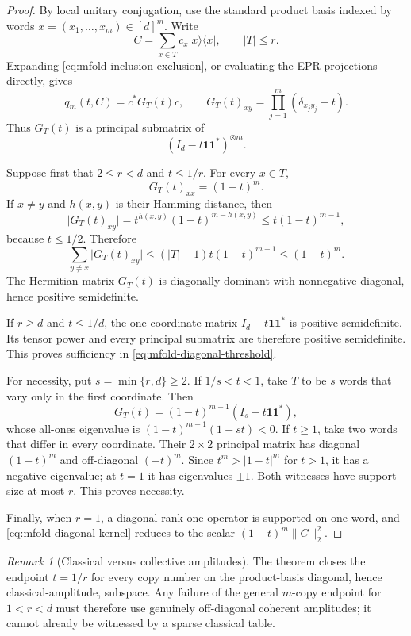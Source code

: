 \documentclass[11pt,reqno]{amsart}
\theoremstyle{remark}
\newtheorem{remark}[theorem]{Remark}
\newcommand{\ketbra}[2]{\lvert #1\rangle\!\langle #2\rvert}
\newcommand{\norm}[1]{\lVert #1\rVert}
\newcommand{\abs}[1]{\lvert #1\rvert}
\begin{document}
\begin{proof}
By local unitary conjugation, use the standard product basis indexed by
words $x=(x_1,\ldots,x_m)\in[d]^m$.  Write
\[
    C=\sum_{x\in T}c_x\ketbra{x}{x},
    \qquad \abs T\le r.
\]
Expanding \cref{eq:mfold-inclusion-exclusion}, or evaluating the EPR
projections directly, gives
\begin{equation}
\label{eq:mfold-diagonal-kernel}
    q_m(t,C)=c^*G_T(t)c,
    \qquad
    G_T(t)_{xy}
    =\prod_{j=1}^m(\delta_{x_jy_j}-t).
\end{equation}
Thus $G_T(t)$ is a principal submatrix of
\[
    (I_d-t\mathbf1\mathbf1^*)^{\otimes m}.
\]

Suppose first that $2\le r<d$ and $t\le1/r$.  For every $x\in T$,
\[
    G_T(t)_{xx}=(1-t)^m.
\]
If $x\ne y$ and $h(x,y)$ is their Hamming distance, then
\[
    \abs{G_T(t)_{xy}}
    =t^{h(x,y)}(1-t)^{m-h(x,y)}
    \le t(1-t)^{m-1},
\]
because $t\le1/2$.  Therefore
\[
    \sum_{y\ne x}\abs{G_T(t)_{xy}}
    \le(\abs T-1)t(1-t)^{m-1}
    \le(1-t)^m.
\]
The Hermitian matrix $G_T(t)$ is diagonally dominant with nonnegative
diagonal, hence positive semidefinite.

If $r\ge d$ and $t\le1/d$, the one-coordinate matrix
$I_d-t\mathbf1\mathbf1^*$ is positive semidefinite.  Its tensor power
and every principal submatrix are therefore positive semidefinite.
This proves sufficiency in \cref{eq:mfold-diagonal-threshold}.

For necessity, put $s=\min\{r,d\}\ge2$.  If $1/s<t<1$, take $T$ to
be $s$ words that vary only in the first coordinate.  Then
\[
    G_T(t)=(1-t)^{m-1}
           (I_s-t\mathbf1\mathbf1^*),
\]
whose all-ones eigenvalue is
$(1-t)^{m-1}(1-st)<0$.  If $t\ge1$, take two words that differ in
every coordinate.  Their $2\times2$ principal matrix has diagonal
$(1-t)^m$ and off-diagonal $(-t)^m$.  Since
$t^m>\abs{1-t}^m$ for $t>1$, it has a negative eigenvalue; at $t=1$
it has eigenvalues $\pm1$.  Both witnesses have support size at most
$r$.  This proves necessity.

Finally, when $r=1$, a diagonal rank-one operator is supported on one
word, and \cref{eq:mfold-diagonal-kernel} reduces to the scalar
$(1-t)^m\norm C_2^2$.
\end{proof}

\begin{remark}[Classical versus collective amplitudes]
The theorem closes the endpoint $t=1/r$ for every copy number on the
product-basis diagonal, hence classical-amplitude, subspace.  Any
failure of the general $m$-copy endpoint for $1<r<d$ must therefore
use genuinely off-diagonal coherent amplitudes; it cannot already be
witnessed by a sparse classical table.
\end{remark}
\end{document}
